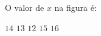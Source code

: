 O valor de $x$ na figura \'e:

\parbox{0.3\linewidth}{

$14$
$13$
$12$
$15$
$16$

}\parbox{0.69\linewidth}{
\begin{center}
\vspace{-6mm}
\vspace{-9mm}
\end{center}
}


